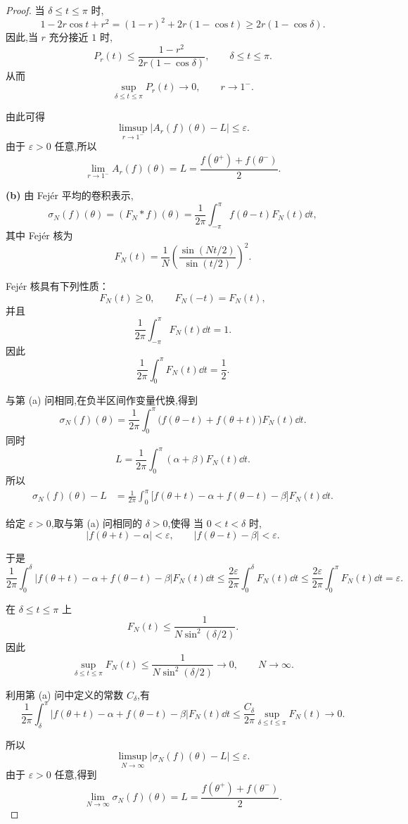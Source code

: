 \begin{proof}
	当 $\delta\leq t\leq\pi$ 时,
	\[
	1-2r\cos t+r^2
	=(1-r)^2+2r(1-\cos t)
	\geq 2r(1-\cos\delta).
	\]
	因此,当 $r$ 充分接近 $1$ 时,
	\[
	P_r(t)
	\leq
	\frac{1-r^2}{2r(1-\cos\delta)},
	\qquad \delta\leq t\leq\pi.
	\]
	从而
	\[
	\sup_{\delta\leq t\leq\pi}P_r(t)\to0,
	\qquad r\to1^-.
	\]
	
	由此可得
	\[
	\limsup_{r\to1^-}|A_r(f)(\theta)-L|
	\leq\varepsilon.
	\]
	由于 $\varepsilon>0$ 任意,所以
	\[
	\lim_{r\to1^-}A_r(f)(\theta)
	=L
	=\frac{f(\theta^+)+f(\theta^-)}{2}.
	\]

	
	\textbf{(b)}
	由 Fej\'er 平均的卷积表示,
	\[
	\sigma_N(f)(\theta)
	=(F_N*f)(\theta)
	=\frac{1}{2\pi}\int_{-\pi}^{\pi}
	f(\theta-t)F_N(t)\dd t,
	\]
	其中 Fej\'er 核为
	\[
	F_N(t)
	=\frac{1}{N}
	\left(
	\frac{\sin(Nt/2)}{\sin(t/2)}
	\right)^2.
	\]
	
	Fej\'er 核具有下列性质：
	\[
	F_N(t)\geq0,\qquad F_N(-t)=F_N(t),
	\]
	并且
	\[
	\frac{1}{2\pi}\int_{-\pi}^{\pi}F_N(t)\dd t=1.
	\]
	因此
	\[
	\frac{1}{2\pi}\int_0^\pi F_N(t)\dd t=\frac12.
	\]
	
	与第 (a) 问相同,在负半区间作变量代换,得到
	\[
	\sigma_N(f)(\theta)
	=
	\frac{1}{2\pi}\int_0^\pi
	\bigl(f(\theta-t)+f(\theta+t)\bigr)F_N(t)\dd t.
	\]
	同时
	\[
	L
	=
	\frac{1}{2\pi}\int_0^\pi
	(\alpha+\beta)F_N(t)\dd t.
	\]
	所以
	\[
	\begin{aligned}
		\sigma_N(f)(\theta)-L
		&=\frac{1}{2\pi}\int_0^\pi
		\bigl[
		f(\theta+t)-\alpha
		+f(\theta-t)-\beta
		\bigr]F_N(t)\dd t.
	\end{aligned}
	\]
	
	给定 $\varepsilon>0$,取与第 (a) 问相同的 $\delta>0$,使得
	当 $0<t<\delta$ 时,
	\[
	|f(\theta+t)-\alpha|<\varepsilon,
	\qquad
	|f(\theta-t)-\beta|<\varepsilon.
	\]
	
	于是
	\[\frac{1}{2\pi}\int_0^\delta
		\left|
		f(\theta+t)-\alpha
		+f(\theta-t)-\beta
		\right|F_N(t)\dd t
		\leq
		\frac{2\varepsilon}{2\pi}
		\int_0^\delta F_N(t)\dd t\leq
		\frac{2\varepsilon}{2\pi}
		\int_0^\pi F_N(t)\dd t
		=\varepsilon.
	\]
	
	在 $\delta\leq t\leq\pi$ 上
	\[
	F_N(t)
	\leq
	\frac{1}{N\sin^2(\delta/2)}.
	\]
	因此
	\[
	\sup_{\delta\leq t\leq\pi}F_N(t)
	\leq
	\frac{1}{N\sin^2(\delta/2)}
	\to0,
	\qquad N\to\infty.
	\]
	
	利用第 (a) 问中定义的常数 $C_\delta$,有
	\[\frac{1}{2\pi}\int_\delta^\pi
		\left|
		f(\theta+t)-\alpha
		+f(\theta-t)-\beta
		\right|F_N(t)\dd t\leq
		\frac{C_\delta}{2\pi}
		\sup_{\delta\leq t\leq\pi}F_N(t)
		\to0.
	\]
	
	所以
	\[
	\limsup_{N\to\infty}
	|\sigma_N(f)(\theta)-L|
	\leq\varepsilon.
	\]
	由于 $\varepsilon>0$ 任意,得到
	\[
	\lim_{N\to\infty}\sigma_N(f)(\theta)
	=L
	=\frac{f(\theta^+)+f(\theta^-)}{2}.
	\]

\end{proof}
